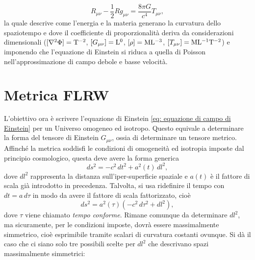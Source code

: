 \begin{equation}
\label{eq: equazione di campo di Einstein}
    R_{\mu\nu} - \frac{1}{2} R g_{\mu\nu} = \frac{8\pi G}{c^4} T_{\mu\nu},
\end{equation}
la quale descrive come l'energia e la materia generano la curvatura dello spaziotempo e dove il coefficiente di proporzionalità deriva da considerazioni dimensionali ($[\nabla^2 \Phi] = \mathrm{T}^{-2}$, $[G_{\mu\nu}] = \mathrm{L}^0$, $[\rho] = \mathrm{M}\mathrm{L}^{-3}$, $[T_{\mu\nu}] = \mathrm{M}\mathrm{L}^{-1}\mathrm{T}^{-2}$) e imponendo che l'equazione di Einstein si riduca a quella di Poisson nell'approssimazione di campo debole e basse velocità.

\section{Metrica FLRW}
L'obiettivo ora è scrivere l'equazione di Einstein \eqref{eq: equazione di campo di Einstein} per un Universo omogeneo ed isotropo. Questo equivale a determinare la forma del tensore di Einstein $G_{\mu\nu}$, ossia di determinare un tensore metrico. Affinché la metrica soddisfi le condizioni di omogeneità ed isotropia imposte dal principio cosmologico, questa deve avere la forma generica
\begin{equation}
    ds^2 = -c^2\,dt^2 + a^2(t)\,dl^2,
\end{equation}
dove $dl^2$ rappresenta la distanza sull'iper-superficie spaziale e $a(t)$ è il fattore di scala già introdotto in precedenza. Talvolta, si usa ridefinire il tempo con $dt = a\,d\tau$ in modo da avere il fattore di scala fattorizzato, cioè 
\begin{equation}
    ds^2 = a^2(\tau)(-c^2\,d\tau^2 + dl^2),
\end{equation}
dove $\tau$ viene chiamato \emph{tempo conforme}. Rimane comunque da determinare $dl^2$, ma sicuramente, per le condizioni imposte, dovrà essere massimalmente simmetrico, cioè esprimibile tramite scalari di curvatura costanti ovunque. Si dà il caso che ci siano solo tre possibili scelte per $dl^2$ che descrivano spazi massimalmente simmetrici:
